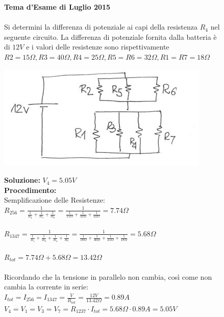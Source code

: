 \begin{figure}[h!]
\textbf{Tema d'Esame di Luglio 2015}\\ \\
Si determini la differenza di potenziale ai capi della resistenza $R_4$ nel seguente circuito. La differenza di potenziale fornita dalla batteria è di $12V$ e i valori delle resistenze sono rispettivamente $R2=15\Omega, R3=40\Omega, R4=25\Omega, R5=R6=32\Omega, R1=R7=18\Omega$
	\begin{center}
		\includegraphics[scale=1]{ES5/LUG052015.jpg}
	\end{center}
	\begin{boxed}
		\null\hfill \textbf{Soluzione:} $V_4 = 5.05 V$\\
		\textbf{Procedimento: } \\
		Semplificazione delle Resistenze:\\
		$R_{256}=\frac{1}{\frac{1}{R_2}+\frac{1}{R_5}+\frac{1}{R_6}}=\frac{1}{\frac{1}{15\Omega}+\frac{1}{32\Omega}+\frac{1}{32\Omega}}=7.74\Omega$\\\\
		$R_{1347}=\frac{1}{\frac{1}{R_1}+\frac{1}{R_3}+\frac{1}{R_4}+\frac{1}{R_7}}=\frac{1}{\frac{1}{18\Omega}+\frac{1}{40\Omega}+\frac{1}{25\Omega}+\frac{1}{18\Omega}}=5.68\Omega$\\ \\ 
		$R_{tot}=7.74\Omega+5.68\Omega=13.42\Omega$\\ \\
		Ricordando che la tensione in parallelo non cambia, così come non cambia la corrente in serie:\\
		$I_{tot}=I_{256}=I_{1347}=\frac{V}{R_{tot}}=\frac{12V}{13.42\Omega}=0.89A$\\
		$V_4=V_1=V_3=V_7=R_{1237}\cdot I_{tot}=5.68\Omega\cdot 0.89A=5.05V$
	\end{boxed}
\end{figure}